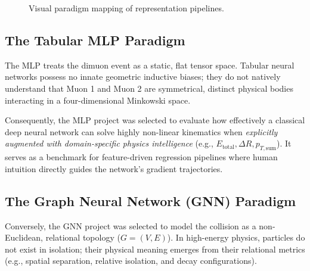 \documentclass[11pt,a4paper,oneside]{article}
\begin{document}
\begin{figure}[h!]
\centering
{}
\caption{Visual paradigm mapping of representation pipelines.}
\end{figure}

\subsection*{The Tabular MLP Paradigm}
The MLP treats the dimuon event as a static, flat tensor space. Tabular neural networks possess no innate geometric inductive biases; they do not natively understand that Muon 1 and Muon 2 are symmetrical, distinct physical bodies interacting in a four-dimensional Minkowski space.

Consequently, the MLP project was selected to evaluate how effectively a classical deep neural network can solve highly non-linear kinematics when \emph{explicitly augmented with domain-specific physics intelligence} (e.g., $E_{\text{total}}, \Delta R, p_{T,\text{sum}}$). It serves as a benchmark for feature-driven regression pipelines where human intuition directly guides the network's gradient trajectories.

\subsection*{The Graph Neural Network (GNN) Paradigm}
Conversely, the GNN project was selected to model the collision as a non-Euclidean, relational topology ($G = (V, E)$). In high-energy physics, particles do not exist in isolation; their physical meaning emerges from their relational metrics (e.g., spatial separation, relative isolation, and decay configurations).
\end{document}
